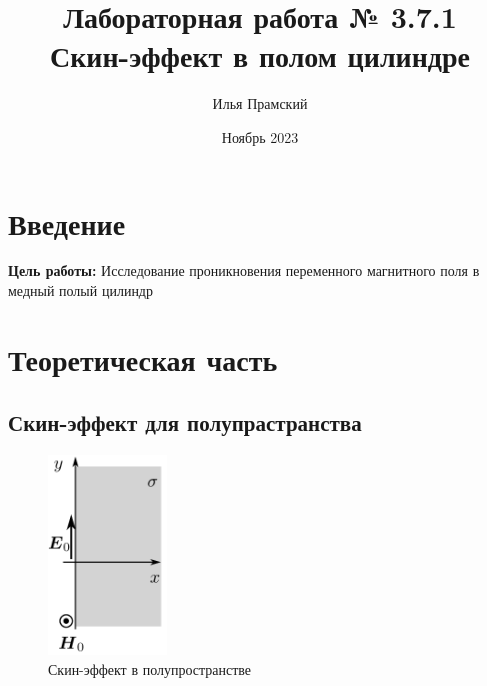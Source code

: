 \documentclass[a4paper,12pt]{article}
\title{Лабораторная работа № 3.7.1\\Скин-эффект в полом цилиндре}
\author{Илья Прамский}
\date{Ноябрь 2023}
\begin{document}
\maketitle
\newpage
\section*{Введение}
\textbf{Цель работы:} Исследование проникновения переменного магнитного поля в медный полый цилиндр

\section{Теоретическая часть}
\subsection{Скин-эффект для полупрастранства}
\vspace{1cm}
\begin{figure}
  \begin{center}
    \includegraphics[width=0.28\textwidth]{poluprostranstvo}
  \end{center}
  \caption{Скин-эффект в полупространстве}\label{fig:poluprostranstvo}
\end{figure}
\end{document}
